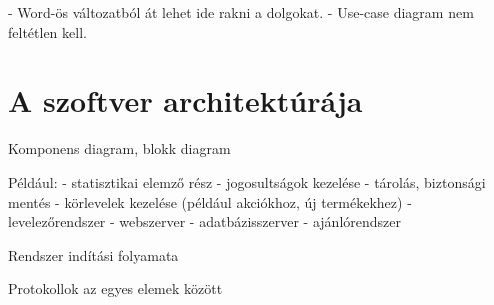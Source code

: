 - Word-ös változatból át lehet ide rakni a dolgokat.
- Use-case diagram nem feltétlen kell.

\section{A szoftver architektúrája}

Komponens diagram, blokk diagram

Például:
- statisztikai elemző rész
- jogosultságok kezelése
- tárolás, biztonsági mentés
- körlevelek kezelése (például akciókhoz, új termékekhez)
- levelezőrendszer
- webszerver
- adatbázisszerver
- ajánlórendszer

Rendszer indítási folyamata

Protokollok az egyes elemek között
